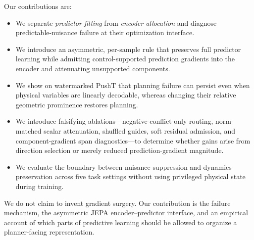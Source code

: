 Our contributions are:
\begin{itemize}
    \item We separate \emph{predictor fitting} from \emph{encoder allocation}
    and diagnose predictable-nuisance failure at their optimization interface.
    \item We introduce an asymmetric, per-sample rule that preserves full
    predictor learning while admitting control-supported prediction gradients
    into the encoder and attenuating unsupported components.
    \item We show on watermarked PushT that planning failure can persist even
    when physical variables are linearly decodable, whereas changing their
    relative geometric prominence restores planning.
    \item We introduce falsifying ablations---negative-conflict-only routing,
    norm-matched scalar attenuation, shuffled guides, soft residual admission,
    and component-gradient span diagnostics---to determine whether gains arise
    from direction selection or merely reduced prediction-gradient magnitude.
    \item We evaluate the boundary between nuisance suppression and dynamics
    preservation across five task settings without using privileged physical
    state during training.
\end{itemize}

We do not claim to invent gradient surgery.  Our contribution is the failure
mechanism, the asymmetric JEPA encoder--predictor interface, and an empirical
account of which parts of predictive learning should be allowed to organize a
planner-facing representation.
